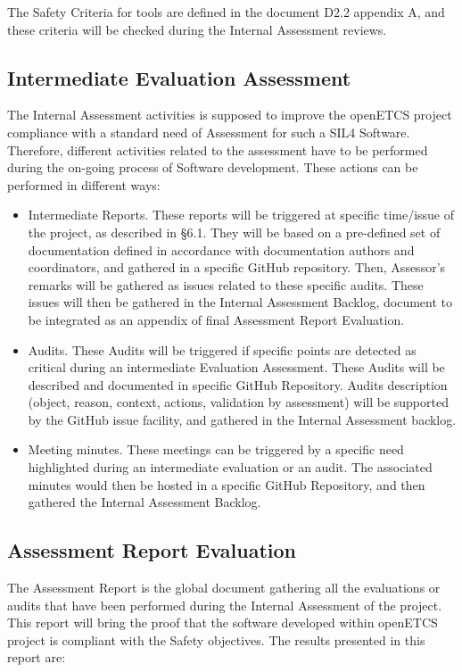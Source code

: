 \documentclass{template/openetcs_article}
\begin{document}
The Safety Criteria for tools are defined in the document D2.2 appendix A, and these criteria will be checked during the Internal Assessment reviews. 

\subsection{Intermediate Evaluation Assessment}
The Internal Assessment activities is supposed to improve the openETCS project compliance with a standard need of Assessment for such a SIL4 Software.
Therefore, different activities related to the assessment have to be performed during the on-going process of Software development. These actions can be performed in different ways:

\begin{itemize}
\item Intermediate Reports. These reports will be triggered at specific time/issue of the project, as described in §6.1. They will be based on a pre-defined set
of documentation defined in accordance with documentation authors and coordinators, and gathered in a specific GitHub repository. Then, Assessor's remarks will
be gathered as issues related to these specific audits. These issues will then be gathered in the Internal Assessment Backlog, document to be integrated as an
appendix of final Assessment Report Evaluation.
\item Audits. These Audits will be triggered if specific points are detected as critical during an intermediate Evaluation Assessment. These Audits will be
described and documented in specific GitHub Repository. Audits description (object, reason, context, actions, validation by assessment) will be supported by the
GitHub issue facility, and gathered in the Internal Assessment backlog.
\item Meeting minutes. These meetings can be triggered by a specific need highlighted during an intermediate evaluation or an audit. The associated minutes
would then be hosted in a specific GitHub Repository, and then gathered the Internal Assessment Backlog.
\end{itemize}


\subsection{Assessment Report Evaluation}
The Assessment Report is the global document gathering all the evaluations or audits that have been performed during the Internal Assessment of the project.
This report will bring the proof that the software developed within openETCS project is compliant with the Safety objectives.
The results presented in this report are:
\end{document}
